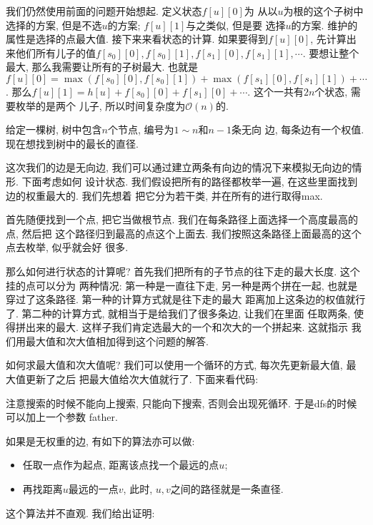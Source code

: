  我们仍然使用前面的问题开始想起. 定义状态$f[u][0]$为 
从以$u$为根的这个子树中选择的方案, 但是不选$u$的方案; $f[u][1]$与之类似, 但是要
选择$u$的方案. 维护的属性是选择的点最大值. 接下来来看状态的计算. 如果要得到$f[u][0]$, 
先计算出来他们所有儿子的值$f[s_0][0], f[s_0][1], f[s_1][0], f[s_1][1],\cdots$. 
要想让整个最大, 那么我需要让所有的子树最大. 也就是
$f[u][0]=\max(f[s_0][0], f[s_0][1])+\max(f[s_1][0], f[s_1][1])+\cdots$.
那么$f[u][1]=h[u]+f[s_0][0]+f[s_1][0]+\cdots$. 这个一共有$2n$个状态, 需要枚举的是两个
儿子, 所以时间复杂度为$\mathcal O(n)$的.  

 给定一棵树, 树中包含$n$个节点, 编号为$1\sim n$和$n-1$条无向
边, 每条边有一个权值. 现在想找到树中的最长的直径. 

这次我们的边是无向边, 我们可以通过建立两条有向边的情况下来模拟无向边的情形. 下面考虑如何 
设计状态. 我们假设把所有的路径都枚举一遍, 在这些里面找到边的权重最大的. 我们先想着
把它分为若干类, 并在所有的进行取得max. 

首先随便找到一个点, 把它当做根节点. 我们在每条路径上面选择一个高度最高的点, 然后把
这个路径归到最高的点这个上面去. 我们按照这条路径上面最高的这个点去枚举, 似乎就会好
很多. 

那么如何进行状态的计算呢? 首先我们把所有的子节点的往下走的最大长度. 这个挂的点可以分为
两种情况: 第一种是一直往下走, 另一种是两个拼在一起, 也就是穿过了这条路径. 
第一种的计算方式就是往下走的最大
距离加上这条边的权值就行了. 第二种的计算方式, 就相当于是给我们了很多条边, 让我们在里面
任取两条, 使得拼出来的最大. 这样子我们肯定选最大的一个和次大的一个拼起来. 这就指示
我们用最大值和次大值相加得到这个问题的解答. 

如何求最大值和次大值呢? 我们可以使用一个循环的方式, 每次先更新最大值, 最大值更新了之后
把最大值给次大值就行了. 下面来看代码: 

注意搜索的时候不能向上搜索, 只能向下搜索, 否则会出现死循环. 于是dfs的时候可以加上一个参数
father.  

如果是无权重的边, 有如下的算法亦可以做: 

\begin{itemize}
    \item 任取一点作为起点, 距离该点找一个最远的点$u$;
    \item 再找距离$u$最远的一点$v$, 此时, $u,v$之间的路径就是一条直径.
\end{itemize}

这个算法并不直观. 我们给出证明: 

